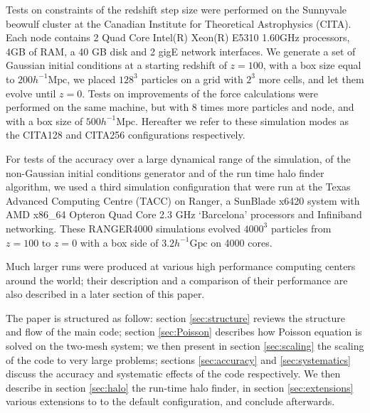 Tests on constraints of the redshift step size were performed 
on the Sunnyvale beowulf cluster at the Canadian Institute for Theoretical Astrophysics (CITA).
Each node contains 2 Quad Core Intel(R) Xeon(R) E5310 1.60GHz processors, 4GB of RAM,  a 40 GB disk and 2 gigE network interfaces. 
We generate a set of Gaussian initial conditions at a starting redshift of $z = 100$, 
with a box size equal to $200 h^{-1}\mbox{Mpc}$, we placed
$128^{3}$  particles on a grid with $2^{3}$ more cells, and let them evolve until $z=0$.
Tests on improvements of the force calculations were performed on the same machine, but with 8 times more particles and node, 
and with a box size of $500 h^{-1}\mbox{Mpc}$.
Hereafter we refer to these simulation modes as the CITA128 and CITA256 configurations respectively.

For tests of the accuracy over a large dynamical range of the simulation, of the non-Gaussian initial conditions generator and of the run time halo finder algorithm, 
we used a third simulation configuration that were run at the Texas Advanced Computing Centre (TACC) on Ranger, a SunBlade 
x6420 system with AMD x86\_64 Opteron Quad Core 2.3 GHz `Barcelona' processors and Infiniband networking.
These RANGER4000 simulations evolved $4000^{3}$ particles 
from $z=100$ to $z=0$ with a box side of $3.2 h^{-1}\mbox{Gpc}$
on 4000 cores.
 
 Much larger runs were produced at various high performance computing centers
 around the world; their description and a comparison of their performance are also described in a later section of this paper. 
 

The paper is structured as follow: section \ref{sec:structure} reviews the structure and flow of the main code;
section \ref{sec:Poisson} describes how Poisson equation is solved on the two-mesh system;
we then present in section \ref{sec:scaling} the scaling of the code to very large problems;
sections \ref{sec:accuracy} and \ref{sec:systematics} discuss the accuracy and systematic effects of the code respectively.
 We then describe in section \ref{sec:halo} the run-time halo finder, in section \ref{sec:extensions} various extensions to 
 to the default configuration, and conclude afterwards.




